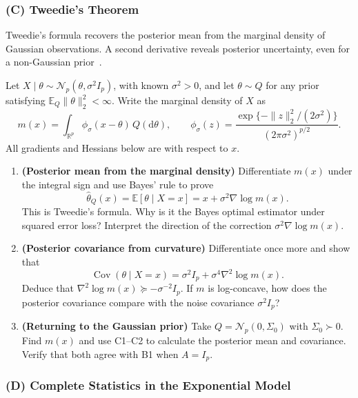 \subsubsection*{(C) Tweedie's Theorem}
{}
\label{ex:tweedie}

Tweedie's formula recovers the posterior mean from the marginal density of Gaussian observations. A
second derivative reveals posterior uncertainty, even for a non-Gaussian prior~\cite{efron2011tweedie}.

Let $X\mid\theta\sim\mathcal N_p(\theta,\sigma^2 I_p)$, with known $\sigma^2>0$, and let $\theta\sim Q$ for any prior satisfying $\mathbb E_Q\|\theta\|_2^2<\infty$. Write the marginal density of $X$ as
\[
 m(x)=\int_{\mathbb R^p}\phi_\sigma(x-\theta)\,Q(\mathrm d\theta),\qquad
 \phi_\sigma(z)=\frac{\exp\{-\|z\|_2^2/(2\sigma^2)\}}{(2\pi\sigma^2)^{p/2}}.
\]
All gradients and Hessians below are with respect to $x$.

\begin{enumerate}[label=\textcolor{AccentInk}{\sffamily\bfseries C\arabic*.},ref=C\arabic*,leftmargin=2.65em,labelsep=0.65em,itemsep=1em]
\item \textbf{(Posterior mean from the marginal density)} Differentiate $m(x)$ under the integral sign and use Bayes' rule to prove
\[
 \hat\theta_Q(x)=\mathbb E[\theta\mid X=x]=x+\sigma^2\nabla\log m(x).
\]
This is Tweedie's formula. Why is it the Bayes optimal estimator under squared error loss? Interpret the direction of the correction $\sigma^2\nabla\log m(x)$.

\item \textbf{(Posterior covariance from curvature)} Differentiate once more and show that
\[
 \operatorname{Cov}(\theta\mid X=x)=\sigma^2 I_p+\sigma^4\nabla^2\log m(x).
\]
Deduce that $\nabla^2\log m(x)\succeq-\sigma^{-2}I_p$. If $m$ is log-concave, how does the posterior covariance compare with the noise covariance $\sigma^2 I_p$?

\item \textbf{(Returning to the Gaussian prior)} Take $Q=\mathcal N_p(0,\Sigma_0)$ with $\Sigma_0\succ0$. Find $m(x)$ and use C1--C2 to calculate the posterior mean and covariance. Verify that both agree with B1 when $A=I_p$.
\end{enumerate}

\subsubsection*{(D) Complete Statistics in the Exponential Model}
{}
\label{ex:exponential-completeness}

